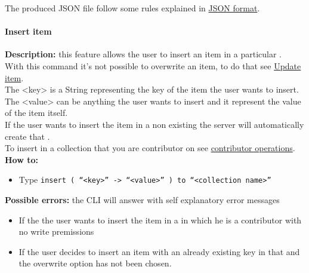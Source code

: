 \documentclass{scalatekids-article}
\begin{document}
The produced JSON file follow some rules explained in \hyperref[sec:JSONFormat]{JSON format}.

\paragraph{Insert item}
\label{sec:insertitem}
\textbf{Description:} this feature allows the user to insert an item in a particular .\\
With this command it's not possible to overwrite an item, to do that see \hyperref[sec:updateditem]{Update item}.\\
The <key> is a String representing the key of the item the user wants to insert.\\
The <value> can be anything the user wants to insert and it represent the value of the item itself.\\
If the user wants to insert the item in a non existing  the server
will automatically create that .\\
To insert in a collection that you are contributor on see \hyperref[sec:contributoroperations]{contributor operations}.\\
\textbf{How to:}
\begin{itemize}
\item Type \texttt{insert ( ``<key>'' -> ``<value>'' ) to ``<collection name>''}
\end{itemize}
\textbf{Possible errors:} the CLI will answer with self explanatory error messages
\begin{itemize}
\item If the  the user wants to insert the item in a  in which he is a contributor with no write premissions
\item If the user decides to insert an item with an already existing key in that  and the overwrite option has not been chosen.
\end{itemize}
\end{document}
